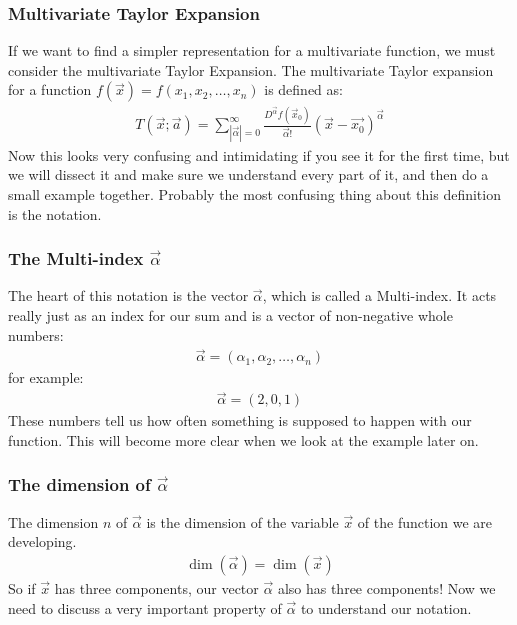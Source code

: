 \documentclass{article}
\begin{document}
	\subsubsection{Multivariate Taylor Expansion}
	If we want to find a simpler representation for a multivariate function, we must consider the multivariate Taylor Expansion. 
	The multivariate Taylor expansion for a function $f(\vec{x})=f(x_1,x_2, \dots, x_n)$ is defined as:
	\begin{align}
		T(\vec{x};\vec{a}) = \sum^\infty_{|\vec{\alpha}|=0}\frac{D^{\Vec{\alpha}}f(\vec{x}_0)}{\vec{\alpha}!}\left(\vec{x}-\vec{x_0}\right)^{\vec{\alpha}}
	\end{align}
	Now this looks very confusing and intimidating if you see it for the first time, but we will dissect it and make sure we understand every part of it, and then do a small example together. Probably the most confusing thing about this definition is the notation. 
	
	\subsubsection*{The Multi-index $\vec{\alpha}$}
	
	The heart of this notation is the vector $\vec{\alpha}$, which is called a Multi-index. 
	It acts really just as an index for our sum and is a vector of non-negative whole numbers:
	\begin{align}
		\vec{\alpha} = (\alpha_1, \alpha_2, \dots,\alpha_n)
	\end{align}
	for example:
	\begin{align}
		\vec{\alpha} = (2,0,1)
	\end{align}
	These numbers tell us how often something is supposed to happen with our function. This will become more clear when we look at the example later on. 
	
	\subsubsection*{The dimension of $\vec{\alpha}$}
	The dimension $n$ of $\vec{\alpha}$ is the dimension of the variable $\vec{x}$ of the function we are developing.
	\begin{align}
		\dim(\vec{\alpha}) = \dim(\vec{x})
	\end{align}
	So if $\vec{x}$ has three components, our vector $\vec{\alpha}$ also has three components!
	Now we need to discuss a very important property of $\vec{\alpha}$ to understand our notation. 
	
\end{document}
